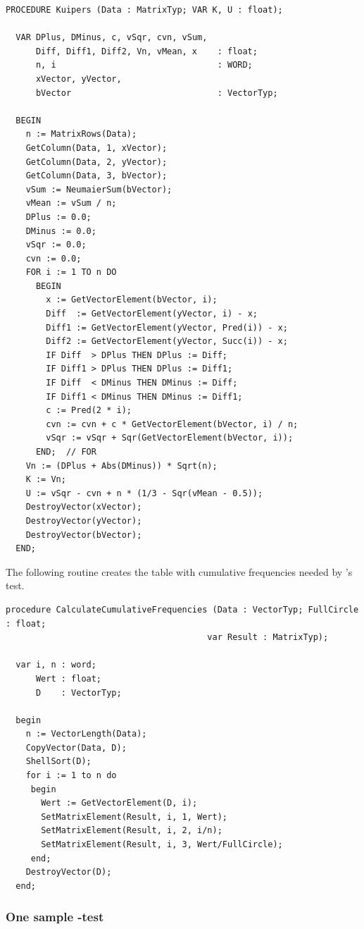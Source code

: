 \begin{refsection}
\begin{lstlisting}[caption=\Name{Kuipers}'s test]
  PROCEDURE Kuipers (Data : MatrixTyp; VAR K, U : float);

  VAR DPlus, DMinus, c, vSqr, cvn, vSum,
      Diff, Diff1, Diff2, Vn, vMean, x    : float;
      n, i                                : WORD;
      xVector, yVector,
      bVector                             : VectorTyp;

  BEGIN
    n := MatrixRows(Data);
    GetColumn(Data, 1, xVector);
    GetColumn(Data, 2, yVector);
    GetColumn(Data, 3, bVector);
    vSum := NeumaierSum(bVector);
    vMean := vSum / n;
    DPlus := 0.0;
    DMinus := 0.0;
    vSqr := 0.0;
    cvn := 0.0;
    FOR i := 1 TO n DO
      BEGIN
        x := GetVectorElement(bVector, i);
        Diff  := GetVectorElement(yVector, i) - x;
        Diff1 := GetVectorElement(yVector, Pred(i)) - x;
        Diff2 := GetVectorElement(yVector, Succ(i)) - x;
        IF Diff  > DPlus THEN DPlus := Diff;
        IF Diff1 > DPlus THEN DPlus := Diff1;
        IF Diff  < DMinus THEN DMinus := Diff;
        IF Diff1 < DMinus THEN DMinus := Diff1;
        c := Pred(2 * i);
        cvn := cvn + c * GetVectorElement(bVector, i) / n;
        vSqr := vSqr + Sqr(GetVectorElement(bVector, i));
      END;  // FOR
    Vn := (DPlus + Abs(DMinus)) * Sqrt(n);
    K := Vn;
    U := vSqr - cvn + n * (1/3 - Sqr(vMean - 0.5));
    DestroyVector(xVector);
    DestroyVector(yVector);
    DestroyVector(bVector);
  END;
\end{lstlisting}

The following routine creates the table with cumulative frequencies needed by 's test.

\begin{lstlisting}[caption=Create frequency table]
  procedure CalculateCumulativeFrequencies (Data : VectorTyp; FullCircle : float;
                                        var Result : MatrixTyp);

  var i, n : word;
      Wert : float;
      D    : VectorTyp;

  begin
    n := VectorLength(Data);
    CopyVector(Data, D);
    ShellSort(D);
    for i := 1 to n do
     begin
       Wert := GetVectorElement(D, i);
       SetMatrixElement(Result, i, 1, Wert);
       SetMatrixElement(Result, i, 2, i/n);
       SetMatrixElement(Result, i, 3, Wert/FullCircle);
     end;
    DestroyVector(D);
  end;
\end{lstlisting}

\subsubsection{One sample -test}


\end{refsection}
